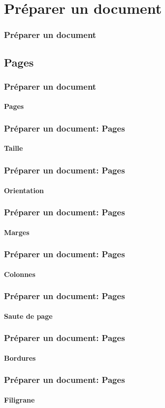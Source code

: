 \documentclass[xcolor=table]{beamer}
\begin{document}
\section{Préparer un document}

\begin{frame}
\frametitle{Préparer un document}

\end{frame}

\subsection{Pages}

\begin{frame}
\frametitle{Préparer un document}
\framesubtitle{Pages}

\end{frame}

\begin{frame}
\frametitle{Préparer un document: Pages}
\framesubtitle{Taille}

\end{frame}

\begin{frame}
\frametitle{Préparer un document: Pages}
\framesubtitle{Orientation}

\end{frame}

\begin{frame}
\frametitle{Préparer un document: Pages}
\framesubtitle{Marges}

\end{frame}

\begin{frame}
\frametitle{Préparer un document: Pages}
\framesubtitle{Colonnes}

\end{frame}

\begin{frame}
\frametitle{Préparer un document: Pages}
\framesubtitle{Saute de page}

\end{frame}

\begin{frame}
\frametitle{Préparer un document: Pages}
\framesubtitle{Bordures}

\end{frame}

\begin{frame}
\frametitle{Préparer un document: Pages}
\framesubtitle{Filigrane}

\end{frame}
\end{document}
